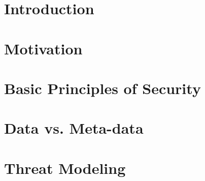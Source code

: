 \documentclass[12pt]{article} %
\begin{document}

\tableofcontents %

\newpage %


\section{Introduction} %
\label{sec:Introduction}



\section{Motivation} %
\label{sec:Motivation}


\section{Basic Principles of Security}
\label{sec:Principles}


\section{Data vs. Meta-data}
\label{sec:DataVMetadata}



\section{Threat Modeling}
\label{sec:ThreatModeling}


\end{document}
